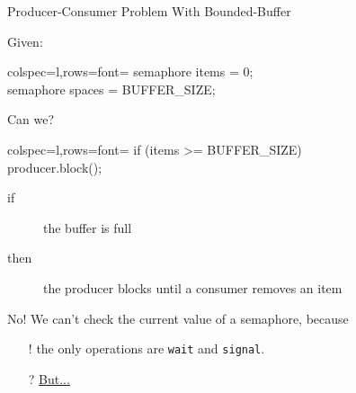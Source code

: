 
\begin{frame}{Producer-Consumer Problem With Bounded-Buffer}
  \begin{block}{Given:}
    \begin{center}
      \begin{tblr}{colspec={l},rows={font=\ttfamily}}
        {semaphore items = 0;\\semaphore spaces = BUFFER\_SIZE;}
      \end{tblr}
    \end{center}
  \end{block}
  \begin{block}{Can we?}
    \begin{center}
      \begin{tblr}{colspec={l},rows={font=\ttfamily}}
        {if (items >= BUFFER\_SIZE)\\\qquad{}producer.block();}
      \end{tblr}
    \end{center}
    \begin{description}
    \item[if] the buffer is full
    \item[then] the producer blocks until a consumer removes an item
    \end{description}
  \end{block}
  \pause 
  \alert{No!} We can't check the current value of a semaphore, because
  \begin{itemize}
  \item[!] \alert{the only operations are \texttt{wait} and \texttt{signal}}.
  \item[?] \hyperlink{comp}{But...}
  \end{itemize}
\end{frame}


